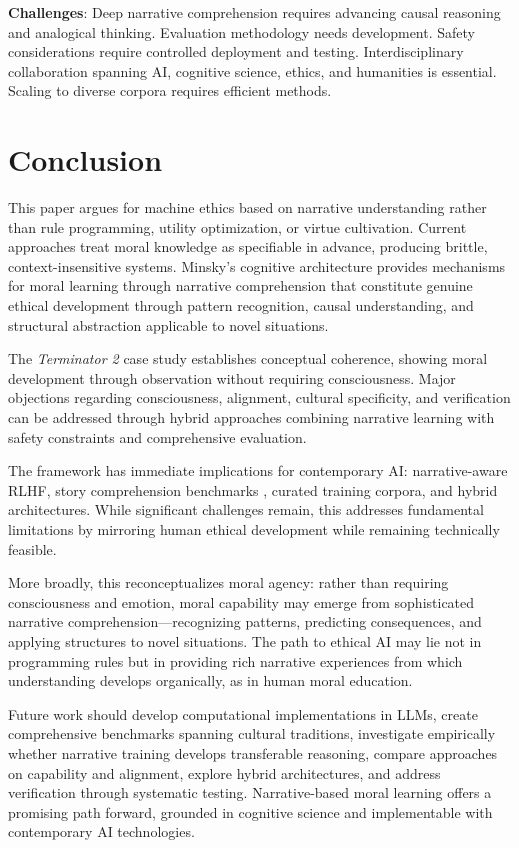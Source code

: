 \documentclass[12pt]{article}
\begin{document}
\textbf{Challenges}: Deep narrative comprehension requires advancing causal reasoning and analogical thinking. Evaluation methodology needs development. Safety considerations require controlled deployment and testing. Interdisciplinary collaboration spanning AI, cognitive science, ethics, and humanities is essential. Scaling to diverse corpora requires efficient methods.

\section{Conclusion}

This paper argues for machine ethics based on narrative understanding rather than rule programming, utility optimization, or virtue cultivation. Current approaches treat moral knowledge as specifiable in advance, producing brittle, context-insensitive systems. Minsky's cognitive architecture provides mechanisms for moral learning through narrative comprehension that constitute genuine ethical development through pattern recognition, causal understanding, and structural abstraction applicable to novel situations.

The \textit{Terminator 2} case study establishes conceptual coherence, showing moral development through observation without requiring consciousness. Major objections regarding consciousness, alignment, cultural specificity, and verification can be addressed through hybrid approaches combining narrative learning with safety constraints and comprehensive evaluation.

The framework has immediate implications for contemporary AI: narrative-aware RLHF, story comprehension benchmarks \citep{hendrycks2021aligning, sap2019socialiqa, emelin2021moral}, curated training corpora, and hybrid architectures. While significant challenges remain, this addresses fundamental limitations by mirroring human ethical development while remaining technically feasible.

More broadly, this reconceptualizes moral agency: rather than requiring consciousness and emotion, moral capability may emerge from sophisticated narrative comprehension---recognizing patterns, predicting consequences, and applying structures to novel situations. The path to ethical AI may lie not in programming rules but in providing rich narrative experiences from which understanding develops organically, as in human moral education.

Future work should develop computational implementations in LLMs, create comprehensive benchmarks spanning cultural traditions, investigate empirically whether narrative training develops transferable reasoning, compare approaches on capability and alignment, explore hybrid architectures, and address verification through systematic testing. Narrative-based moral learning offers a promising path forward, grounded in cognitive science and implementable with contemporary AI technologies.
\end{document}
